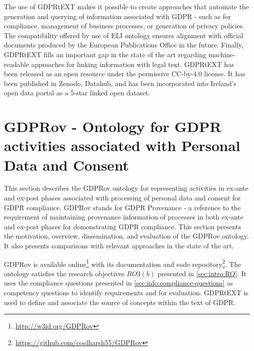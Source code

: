 The use of GDPRtEXT makes it possible to create approaches that automate the generation and querying of information associated with GDPR - such as for compliance, management of business processes, or generation of privacy policies. The compatibility offered by use of ELI ontology ensures alignment with official documents produced by the European Publications Office in the future.
Finally, GDPRtEXT fills an important gap in the state of the art regarding machine-readable approaches for linking information with legal text.
GDPRtEXT has been released as an open resource under the permissive CC-by-4.0 license. It has been published in Zenodo, Datahub, and has been incorporated into Ireland’s open data portal as a 5-star linked open dataset.

\section{GDPRov - Ontology for GDPR activities associated with Personal Data and Consent}\label{sec:voc:GDPRov}
This section describes the GDPRov ontology for representing activities in ex-ante and ex-post phases associated with processing of personal data and consent for GDPR compliance. GDPRov stands for GDPR Provenance - a reference to the requirement of maintaining provenance information of processes in both ex-ante and ex-post phases for demonstrating GDPR compliance. This section presents the motivation, overview, dissemination, and evaluation of the GDPRov ontology. It also presents comparisons with relevant approaches in the state of the art. 

GDPRov is available online\footnote{\url{http://w3id.org/GDPRov}} with its documentation and code repository\footnote{\url{https://github.com/coolharsh55/GDPRov}}.
The ontology satisfies the research objectives $RO3(b)$ presented in \autoref{sec:intro:RQ}.
It uses the compliance questions presented in \autoref{sec:info:compliance-questions} as competency questions to identify requirements and for evaluation.
GDPRtEXT is used to define and associate the source of concepts within the text of GDPR.

